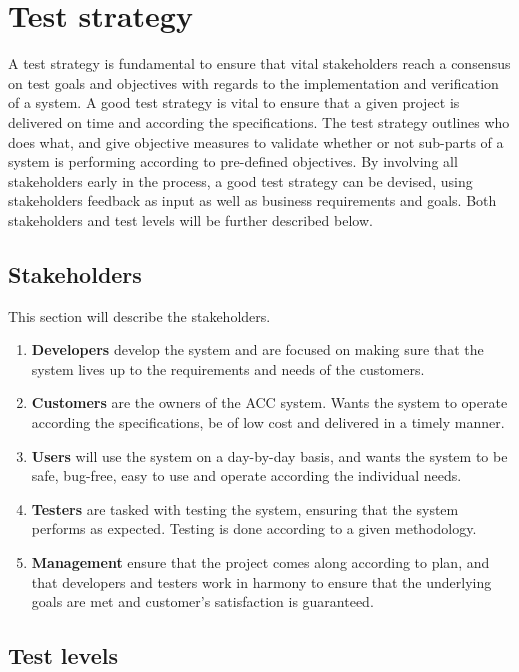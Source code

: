 \section{Test strategy}


A test strategy is fundamental to ensure that vital stakeholders reach a consensus on test goals and objectives with regards to the implementation and verification of a system. A good test strategy is vital to ensure that a given project is delivered on time and according the specifications. The test strategy outlines who does what, and give objective measures to validate whether or not sub-parts of a system is performing according to pre-defined objectives. By involving all stakeholders early in the process, a good test strategy can be devised, using stakeholders feedback as input as well as business requirements and goals. Both stakeholders and test levels will be further described below.

\subsection{Stakeholders}

This section will describe the stakeholders.

\begin{enumerate}
    \item \textbf{Developers} develop the system and are focused on making sure that the system lives up to the requirements and needs of the customers. 
    \item \textbf{Customers} are the owners of the ACC system. Wants the system to operate according the specifications, be of low cost and delivered in a timely manner. 
    \item \textbf{Users} will use the system on a day-by-day basis, and wants the system to be safe, bug-free, easy to use and operate according the individual needs.
    \item \textbf{Testers} are tasked with testing the system, ensuring that the system performs as expected. Testing is done according to a given methodology. 
    \item \textbf{Management} ensure that the project comes along according to plan, and that developers and testers work in harmony to ensure that the underlying goals are met and customer's satisfaction is guaranteed. 
\end{enumerate}





\subsection{Test levels}

